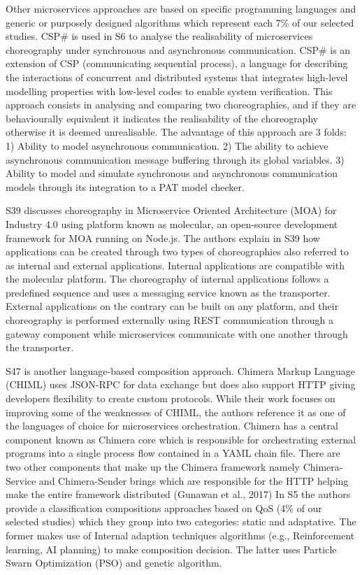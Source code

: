 \documentclass{article}
\begin{document}
\begin{multicols}{2}
Other microservices approaches are based on specific programming languages and generic or purposely designed algorithms which represent each 7\% of our selected studies. CSP\# is used in S6 to analyse the realisability of microservices choreography under synchronous and asynchronous communication. CSP\# is an extension of CSP (communicating sequential process), a language for describing the interactions of concurrent and distributed systems that integrates  high-level modelling properties with low-level codes to enable system verification. This approach consists in analysing and comparing two choreographies, and if they are behaviourally equivalent it indicates the realisability of the choreography otherwise it is deemed unrealisable. The advantage of this approach are 3 folds: 1) Ability to model asynchronous communication. 2) The ability to achieve asynchronous communication message buffering through its global variables. 3) Ability to model and simulate synchronous and asynchronous communication models through its integration to a PAT model checker.

S39 discusses choreography in Microservice Oriented Architecture (MOA) for Industry 4.0 using platform known as molecular,  an open-source development framework for MOA running on Node.js. The authors explain in S39 how applications can be created through two types of choreographies also referred to as internal and external applications. Internal applications are compatible with the molecular platform. The choreography of internal applications follows a predefined sequence and uses a messaging service known as the transporter. External applications on the contrary can be built on any platform, and their choreography is performed externally using REST communication through a gateway component while microservices communicate with one another through the transporter.

S47 is another language-based composition approach. Chimera Markup Language (CHIML) uses JSON-RPC for data exchange but does also support HTTP giving developers flexibility to create custom protocols. While their work focuses on improving some of the weaknesses of CHIML, the authors reference it as one of the languages of choice for microservices orchestration. Chimera has a central component known as Chimera core which is responsible for orchestrating external programs into a single process flow contained in a YAML chain file. There are two other components that make up the Chimera framework namely Chimera-Service and Chimera-Sender brings which are responsible for the HTTP helping make the entire framework distributed (Gunawan et al., 2017)
In S5 the authors provide a classification compositions approaches based on QoS (4\% of our selected studies) which they group into two categories: static and adaptative. The former makes use of Internal adaption techniques algorithms (e.g., Reinforcement learning, AI planning) to make composition decision. The latter uses Particle Swarn Optimization (PSO) and genetic algorithm. 


\end{multicols}
\end{document}
